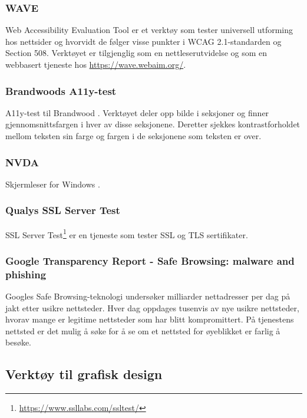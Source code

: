 \subsubsection{WAVE}
\label{sec:wave}
Web Accessibility Evaluation Tool \cite{webaim2018wh} er et verktøy som tester universell utforming hos nettsider og hvorvidt de følger visse punkter i WCAG 2.1-standarden og Section 508. Verktøyet er tilgjenglig som en nettleserutvidelse og som en webbasert tjeneste hos \url{https://wave.webaim.org/}.

\subsubsection{Brandwoods A11y-test} 
\label{sec:brandwoods-a11y-test}
A11y-test til Brandwood  \cite{sl2009sst}. Verktøyet deler opp bilde i seksjoner og finner gjennomsnittsfargen i hver av disse seksjonene. Deretter sjekkes kontrastforholdet mellom teksten sin farge og fargen i de seksjonene som teksten er over.

\subsubsection{NVDA}
\label{sec:analysis-tools-nvda}
Skjermleser for Windows \cite{nvda}.

\subsubsection{Qualys SSL Server Test}
\label{sec:qualys-ssl-server-test}
SSL Server Test\footnote{\url{https://www.ssllabs.com/ssltest/}} er en tjeneste som tester SSL og TLS sertifikater. 

\subsubsection{Google Transparency Report - Safe Browsing: malware and phishing}
\label{sec:google-transparency-report}
Googles Safe Browsing-teknologi \cite{google2019sbs} undersøker milliarder nettadresser per dag på jakt etter usikre nettsteder. Hver dag oppdages tusenvis av nye usikre nettsteder, hvorav mange er legitime nettsteder som har blitt kompromittert. På tjenestens nettsted er det mulig å søke for å se om et nettsted for øyeblikket er farlig å besøke.

\subsection{Verktøy til grafisk design}

